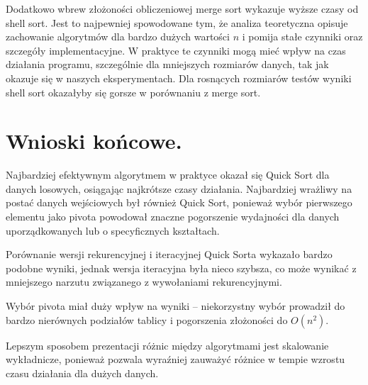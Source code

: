 \documentclass[11pt]{article}
\begin{document}
	Dodatkowo wbrew złożoności obliczeniowej merge sort wykazuje wyższe czasy od shell sort. Jest to najpewniej spowodowane tym, że analiza teoretyczna opisuje zachowanie algorytmów dla bardzo dużych wartości $n$ i pomija stałe czynniki oraz szczegóły implementacyjne. W praktyce te czynniki mogą mieć wpływ na czas działania programu, szczególnie dla mniejszych rozmiarów danych, tak jak okazuje się w naszych eksperymentach. Dla rosnących rozmiarów testów wyniki shell sort okazałyby się gorsze w porównaniu z merge sort.
	
	\section{Wnioski końcowe.}
	Najbardziej efektywnym algorytmem w praktyce okazał się Quick Sort dla danych losowych, osiągając najkrótsze czasy działania. Najbardziej wrażliwy na postać danych wejściowych był również Quick Sort, ponieważ wybór pierwszego elementu jako pivota powodował znaczne pogorszenie wydajności dla danych uporządkowanych lub o specyficznych kształtach.
	
	Porównanie wersji rekurencyjnej i iteracyjnej Quick Sorta wykazało bardzo podobne wyniki, jednak wersja iteracyjna była nieco szybsza, co może wynikać z mniejszego narzutu związanego z wywołaniami rekurencyjnymi.
	
	Wybór pivota miał duży wpływ na wyniki – niekorzystny wybór prowadził do bardzo nierównych podziałów tablicy i pogorszenia złożoności do $O(n^2)$.
	
	Lepszym sposobem prezentacji różnic między algorytmami jest skalowanie wykładnicze, ponieważ pozwala wyraźniej zauważyć różnice w tempie wzrostu czasu działania dla dużych danych.
	
\end{document}
